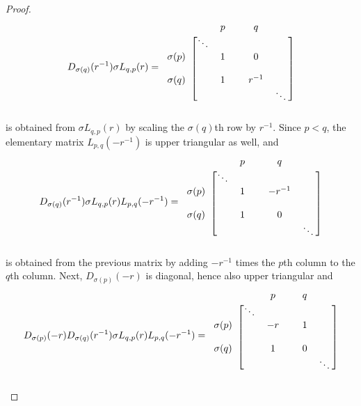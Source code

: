 \documentclass[oneside,11pt]{amsart}
\theoremstyle{definition}
\newtheorem{proof techniques}{Proof Techniques}
\begin{document}
\begin{proof}
\begin{equation*}
D_{\sigma(q)}(r^{-1}) \sigma L_{q,p}(r) = 
\begin{blockarray}{cccccc}
&  & p &  & q &  \\
\begin{block}{c[ccccc]}
  & \ddots &  &  &  &  \\
 \sigma(p)  &  & 1 &  &  0 &  \\
   &  &  &  &  &  \\
 \sigma(q)  &  & 1 &  & r^{-1} &  \\
   &  &  &  &  & \ddots \\
\end{block}
\end{blockarray}
\end{equation*}
is obtained from $\sigma L_{q,p}(r)$ by scaling the $\sigma(q)$th row by $r^{-1}$. Since $p < q$, the elementary matrix $L_{p , q}(-r^{-1})$ is upper triangular as well, and 
\begin{equation*}
D_{\sigma(q)}(r^{-1}) \sigma L_{q,p}(r) L_{p , q}(-r^{-1}) = 
\begin{blockarray}{cccccc}
&  & p &  & q &  \\
\begin{block}{c[ccccc]}
  & \ddots &  &  &  &  \\
 \sigma(p)  &  & 1 &  & -r^{-1} &  \\
   &  &  &  &  &  \\
 \sigma(q)  &  & 1 &  & 0 &  \\
   &  &  &  &  & \ddots \\
\end{block}
\end{blockarray}
\end{equation*}
is obtained from the previous matrix by adding $-r^{-1}$ times the $p$th column to the $q$th column. Next, $D_{\sigma(p)}(-r)$ is diagonal, hence also upper triangular and 
\begin{equation*}
D_{\sigma(p)}(-r) D_{\sigma(q)}(r^{-1}) \sigma L_{q,p}(r) L_{p , q}(-r^{-1}) = 
\begin{blockarray}{cccccc}
&  & p &  & q &  \\
\begin{block}{c[ccccc]}
  & \ddots &  &  &  &  \\
 \sigma(p)  &  & -r &  & 1 &  \\
   &  &  &  &  &  \\
 \sigma(q)  &  & 1 &  & 0 &  \\
   &  &  &  &  & \ddots \\

\end{block}
\end{blockarray}
\end{equation*}
\end{proof}
\end{document}
